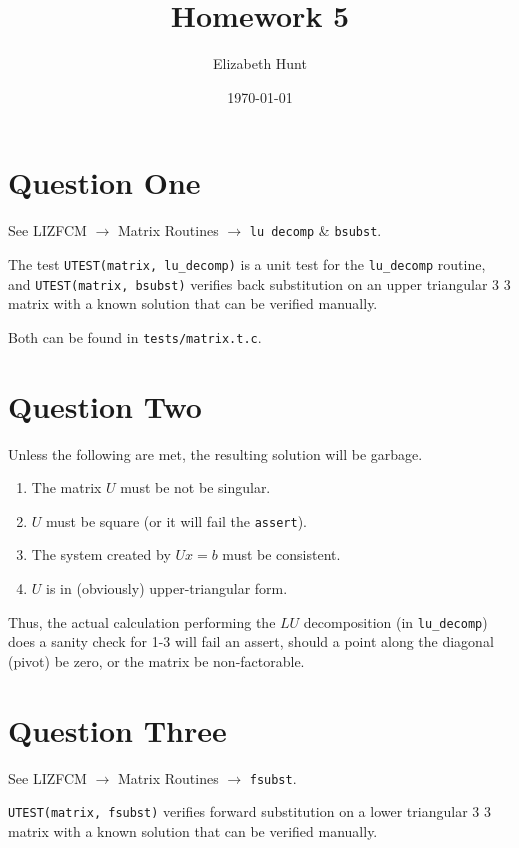 \documentclass[11pt]{article}
\author{Elizabeth Hunt}
\date{\today}
\title{Homework 5}
\begin{document}
\maketitle
\setlength\parindent{0pt}

\section{Question One}
\label{sec:org88abf18}
See LIZFCM \(\rightarrow\) Matrix Routines \(\rightarrow\) \texttt{lu decomp} \& \texttt{bsubst}.

The test \texttt{UTEST(matrix, lu\_decomp)} is a unit test for the \texttt{lu\_decomp} routine,
and \texttt{UTEST(matrix, bsubst)} verifies back substitution on an upper triangular
3 \texttimes{} 3 matrix with a known solution that can be verified manually.

Both can be found in \texttt{tests/matrix.t.c}.

\section{Question Two}
\label{sec:org098a7f1}
Unless the following are met, the resulting solution will be garbage.

\begin{enumerate}
\item The matrix \(U\) must be not be singular.
\item \(U\) must be square (or it will fail the \texttt{assert}).
\item The system created by \(Ux = b\) must be consistent.
\item \(U\) is in (obviously) upper-triangular form.
\end{enumerate}

Thus, the actual calculation performing the \(LU\) decomposition
(in \texttt{lu\_decomp}) does a sanity
check for 1-3 will fail an assert, should a point along the diagonal (pivot) be
zero, or the matrix be non-factorable.

\section{Question Three}
\label{sec:org40d5983}
See LIZFCM \(\rightarrow\) Matrix Routines \(\rightarrow\) \texttt{fsubst}.

\texttt{UTEST(matrix, fsubst)} verifies forward substitution on a lower triangular 3 \texttimes{} 3
matrix with a known solution that can be verified manually.
\end{document}

